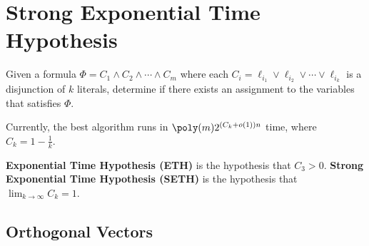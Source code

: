 \chapter{Strong Exponential Time Hypothesis}

\begin{problem}
Given a formula $\Phi = C_1 \wedge C_2 \wedge \cdots \wedge C_m$ where each $C_i = \ell_{i_1} \vee \ell_{i_2} \vee \cdots \vee \ell_{i_k}$ is a disjunction of $k$ literals, determine if there exists an assignment to the variables that satisfies $\Phi$.
\end{problem}

Currently, the best algorithm runs in $\poly(m)2^{(C_k + o(1)) n}$ time, where $C_k = 1 - \frac{1}{k}$.

\begin{definition}
	\textbf{Exponential Time Hypothesis (ETH)} is the hypothesis that $C_3 > 0$.
	\textbf{Strong Exponential Time Hypothesis (SETH)} is the hypothesis that $\lim_{k \to \infty} C_k = 1$.
\end{definition}

\section{Orthogonal Vectors}

